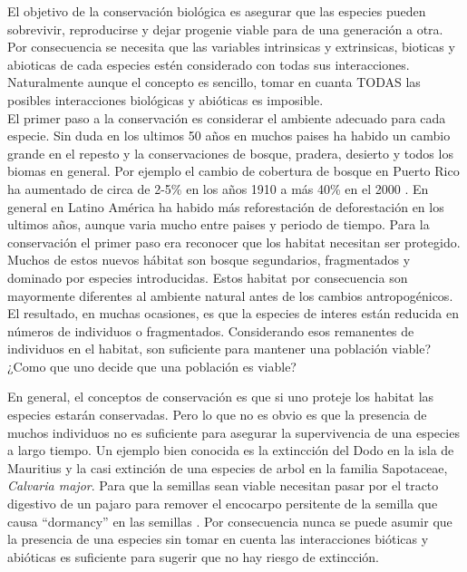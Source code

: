\documentclass[
]{book}
\theoremstyle{definition}
\theoremstyle{definition}
\theoremstyle{definition}
\theoremstyle{definition}
\theoremstyle{remark}
\begin{document}
El objetivo de la conservación biológica es asegurar que las especies pueden sobrevivir, reproducirse y dejar progenie viable para de una generación a otra. Por consecuencia se necesita que las variables intrinsicas y extrinsicas, bioticas y abioticas de cada especies estén considerado con todas sus interacciones. Naturalmente aunque el concepto es sencillo, tomar en cuanta TODAS las posibles interacciones biológicas y abióticas es imposible.\\
El primer paso a la conservación es considerar el ambiente adecuado para cada especie. Sin duda en los ultimos 50 años en muchos paises ha habido un cambio grande en el repesto y la conservaciones de bosque, pradera, desierto y todos los biomas en general. Por ejemplo el cambio de cobertura de bosque en Puerto Rico ha aumentado de circa de 2-5\% en los años 1910 a más 40\% en el 2000 \citep{pares2008agricultural}. En general en Latino América ha habido más reforestación de deforestación \citep{aide2013deforestation} en los ultimos años, aunque varia mucho entre paises y periodo de tiempo. Para la conservación el primer paso era reconocer que los habitat necesitan ser protegido.\\
Muchos de estos nuevos hábitat son bosque segundarios, fragmentados y dominado por especies introducidas. Estos habitat por consecuencia son mayormente diferentes al ambiente natural antes de los cambios antropogénicos. El resultado, en muchas ocasiones, es que la especies de interes están reducida en números de individuos o fragmentados. Considerando esos remanentes de individuos en el habitat, son suficiente para mantener una población viable? ¿Como que uno decide que una población es viable?

En general, el conceptos de conservación es que si uno proteje los habitat las especies estarán conservadas. Pero lo que no es obvio es que la presencia de muchos individuos no es suficiente para asegurar la supervivencia de una especies a largo tiempo. Un ejemplo bien conocida es la extincción del Dodo en la isla de Mauritius y la casi extinción de una especies de arbol en la familia Sapotaceae, \emph{Calvaria major}. Para que la semillas sean viable necesitan pasar por el tracto digestivo de un pajaro para remover el encocarpo persitente de la semilla que causa ``dormancy'' en las semillas \citep{temple1977plant}. Por consecuencia nunca se puede asumir que la presencia de una especies sin tomar en cuenta las interacciones bióticas y abióticas es suficiente para sugerir que no hay riesgo de extincción.
\end{document}
